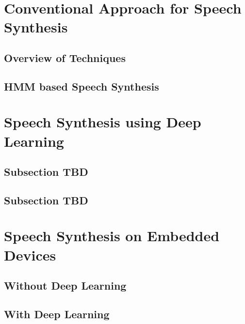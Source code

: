 
\section{Conventional Approach for Speech Synthesis}

\subsection{Overview of Techniques}

\blindtext

\subsection{HMM based Speech Synthesis}

\blindtext

\section{Speech Synthesis using Deep Learning}

\subsection{Subsection TBD}

\blindtext

\subsection{Subsection TBD}

\blindtext

\section{Speech Synthesis on Embedded Devices}

\subsection{Without Deep Learning}

\blindtext

\subsection{With Deep Learning}

\blindtext